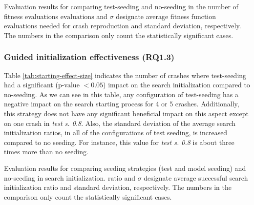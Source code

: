 \begin{table} [t]
	\center
	\caption{Evaluation results for comparing test-seeding and no-seeding in the number of fitness evaluations $\overline{\text{evaluations}}$ and $\sigma$  designate average fitness function evaluations needed for crash reproduction and standard deviation, respectively. The numbers in the comparison only count the statistically significant cases.}
	\label{tab:fitness-evaluation-table}
	\begin{footnotesize}
	
	\end{footnotesize}
\end{table}



\subsubsection{Guided initialization effectiveness (\textbf{RQ1.3})}

Table \ref{tab:starting-effect-size} indicates the number of crashes where test-seeding had a significant (p-value $< 0.05$) impact on the search initialization compared to no-seeding. As we can see in this table, any configuration of test-seeding has a negative impact on the search starting process for 4 or 5 crashes. Additionally, this strategy does not have any significant beneficial impact on this aspect except on one crash in \textit{test s. 0.8}. Also, the standard deviation of the average search initialization ratios, in all of the configurations of test seeding, is increased compared to no seeding. For instance, this value for \textit{test s. 0.8} is about three times more than no seeding.


\begin{table}[t]
	\center
	\caption{Evaluation results for comparing seeding strategies (test and model seeding) and no-seeding in search initialization. $\overline{\text{ratio}}$ and $\sigma$  designate average successful search initialization ratio and standard deviation, respectively. The numbers in the comparison only count the statistically significant cases.}
	\label{tab:starting-effect-size}
	\begin{footnotesize}
		\subfloat{}
		\subfloat{}
	\end{footnotesize}
\end{table}


